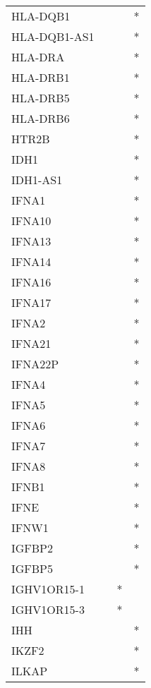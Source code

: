 \begin{longtable}{lccc}
HLA-DQB1       &       &    &       * \\
HLA-DQB1-AS1   &       &    &       * \\
HLA-DRA        &       &    &       * \\
HLA-DRB1       &       &    &       * \\
HLA-DRB5       &       &    &       * \\
HLA-DRB6       &       &    &       * \\
HTR2B          &       &    &       * \\
IDH1           &       &    &       * \\
IDH1-AS1       &       &    &       * \\
IFNA1          &       &    &       * \\
IFNA10         &       &    &       * \\
IFNA13         &       &    &       * \\
IFNA14         &       &    &       * \\
IFNA16         &       &    &       * \\
IFNA17         &       &    &       * \\
IFNA2          &       &    &       * \\
IFNA21         &       &    &       * \\
IFNA22P        &       &    &       * \\
IFNA4          &       &    &       * \\
IFNA5          &       &    &       * \\
IFNA6          &       &    &       * \\
IFNA7          &       &    &       * \\
IFNA8          &       &    &       * \\
IFNB1          &       &    &       * \\
IFNE           &       &    &       * \\
IFNW1          &       &    &       * \\
IGFBP2         &       &    &       * \\
IGFBP5         &       &    &       * \\
IGHV1OR15-1    &       &  * &         \\
IGHV1OR15-3    &       &  * &         \\
IHH            &       &    &       * \\
IKZF2          &       &    &       * \\
ILKAP          &       &    &       * \\

\end{longtable}
